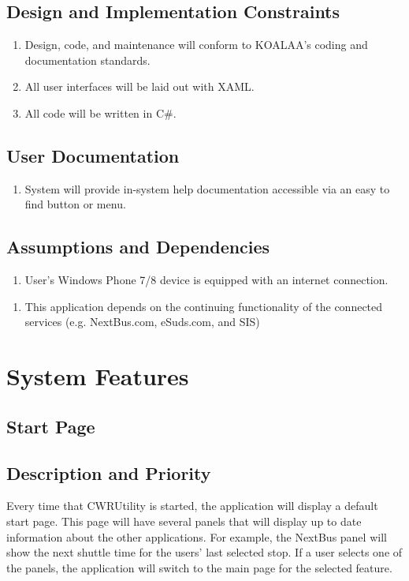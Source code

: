 \documentclass[pdftex,12pt,letter]{article}
\begin{document}
\subsection{Design and Implementation Constraints}
\begin{enumerate}[CO-1:]
\item Design, code, and maintenance will conform to KOALAA's coding and documentation standards.
\item All user interfaces will be laid out with XAML.
\item All code will be written in C\#.
\end{enumerate}
\subsection{User Documentation}
\begin{enumerate}[UD-1:]
\item System will provide in-system help documentation accessible via an easy to find button or menu.
\end{enumerate}
\subsection{Assumptions and Dependencies}
\begin{enumerate}[{A}S-1:]
\item User's Windows Phone 7/8 device is equipped with an internet connection.
\end{enumerate}
\begin{enumerate}[DE-1:]
\item This application depends on the continuing functionality of the connected services (e.g. NextBus.com, eSuds.com, and SIS)
\end{enumerate}
\section{System Features}
\subsection{Start Page}
\subsection{Description and Priority}
Every time that CWRUtility is started, the application will display a default start page. This page will have several panels that will display up to date information about the other applications. For example, the NextBus panel will show the next shuttle time for the users' last selected stop. If a user selects one of the panels, the application will switch to the main page for the selected feature.
\end{document}
